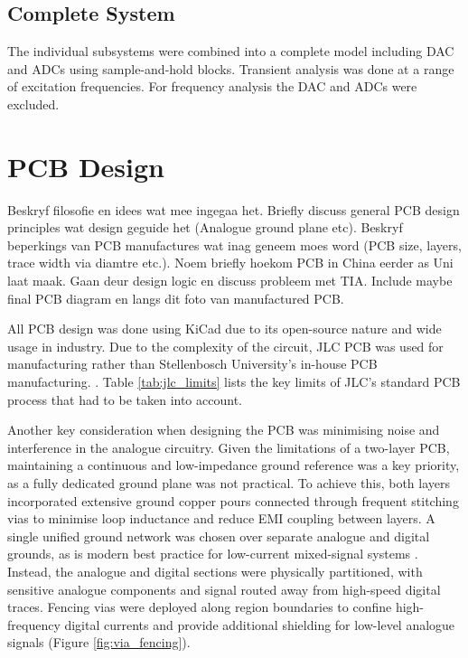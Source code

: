 \subsection{Complete System}
The individual subsystems were combined into a complete model including DAC and ADCs using sample-and-hold blocks. Transient analysis was done at a range of excitation frequencies. For frequency analysis the DAC and ADCs were excluded.

\section{PCB Design}\label{sec:PCB}
Beskryf filosofie en idees wat mee ingegaa het. Briefly discuss general PCB design principles wat design geguide het (Analogue ground plane etc). Beskryf beperkings van PCB manufactures wat inag geneem moes word (PCB size, layers, trace width via diamtre etc.). Noem briefly hoekom PCB in China eerder as Uni laat maak. Gaan deur design logic en discuss probleem met TIA. Include maybe final PCB diagram en langs dit foto van manufactured PCB.

All PCB design was done using KiCad due to its open-source nature and wide usage in industry. Due to the complexity of the circuit, JLC PCB was used for manufacturing rather than Stellenbosch University's in-house PCB manufacturing. . Table \ref{tab:jlc_limits} lists the key limits of JLC's standard PCB process that had to be taken into account. 

Another key consideration when designing the PCB was minimising noise and interference in the analogue circuitry. Given the limitations of a two-layer PCB, maintaining a continuous and low-impedance ground reference was a key priority, as a fully dedicated ground plane was not practical. To achieve this, both layers incorporated extensive ground copper pours connected through frequent stitching vias to minimise loop inductance and reduce \ac{EMI} coupling between layers. A single unified ground network was chosen over separate analogue and digital grounds, as is modern best practice for low-current mixed-signal systems \cite{WhatAreBasic}. Instead, the analogue and digital sections were physically partitioned, with sensitive analogue components and signal routed away from high-speed digital traces. Fencing vias were deployed along region boundaries to confine high-frequency digital currents and provide additional shielding for low-level analogue signals (Figure \ref{fig:via_fencing}).

